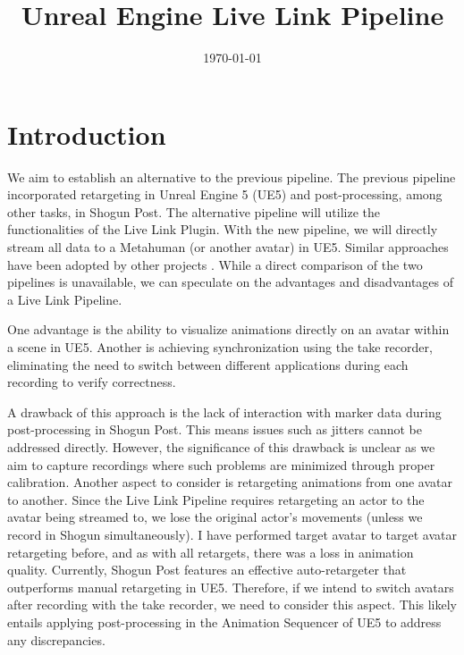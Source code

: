 \documentclass{uva-inf-article}
\title{Unreal Engine Live Link Pipeline}
\date{\today}
\begin{document}
\maketitle



\section{Introduction}
We aim to establish an alternative to the previous pipeline. The previous pipeline incorporated retargeting in Unreal Engine 5 (UE5) and post-processing, among other tasks, in Shogun Post. The alternative pipeline will utilize the functionalities of the Live Link Plugin. With the new pipeline, we will directly stream all data to a Metahuman (or another avatar) in UE5. Similar approaches have been adopted by other projects \cite{auslan, Kara}. While a direct comparison of the two pipelines is unavailable, we can speculate on the advantages and disadvantages of a Live Link Pipeline.

One advantage is the ability to visualize animations directly on an avatar within a scene in UE5. Another is achieving synchronization using the take recorder, eliminating the need to switch between different applications during each recording to verify correctness.

A drawback of this approach is the lack of interaction with marker data during post-processing in Shogun Post. This means issues such as jitters cannot be addressed directly. However, the significance of this drawback is unclear as we aim to capture recordings where such problems are minimized through proper calibration. Another aspect to consider is retargeting animations from one avatar to another. Since the Live Link Pipeline requires retargeting an actor to the avatar being streamed to, we lose the original actor's movements (unless we record in Shogun simultaneously). I have performed target avatar to target avatar retargeting before, and as with all retargets, there was a loss in animation quality. Currently, Shogun Post features an effective auto-retargeter that outperforms manual retargeting in UE5. Therefore, if we intend to switch avatars after recording with the take recorder, we need to consider this aspect. This likely entails applying post-processing in the Animation Sequencer of UE5 to address any discrepancies.
\end{document}
